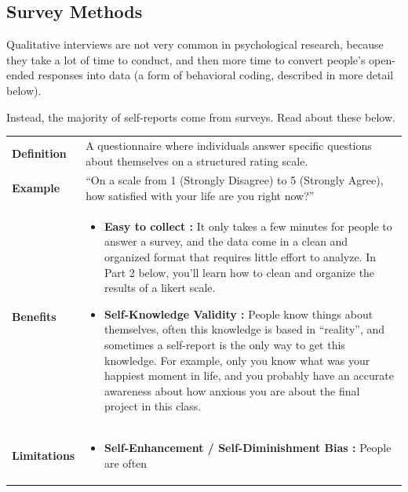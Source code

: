 \documentclass[
  letterpaper,
  DIV=11,
  numbers=noendperiod,
  oneside]{scrreprt}
\begin{document}
\subsection{Survey Methods}\label{survey-methods}

Qualitative interviews are not very common in psychological research,
because they take a lot of time to conduct, and then more time to
convert people's open-ended responses into data (a form of behavioral
coding, described in more detail below).

Instead, the majority of self-reports come from surveys. Read about
these below.

\begin{longtable}[]{@{}
  >{\raggedright\arraybackslash}p{}
  >{\raggedright\arraybackslash}p{}@{}}
\toprule\noalign{}
\endhead
\bottomrule\noalign{}
\endlastfoot
\textbf{Definition} & A questionnaire where individuals answer specific
questions about themselves on a structured rating scale. \\
\textbf{Example} & ``On a scale from 1 (Strongly Disagree) to 5
(Strongly Agree), how satisfied with your life are you right now?'' \\
\textbf{Benefits} & \begin{minipage}[t]{\linewidth}\raggedright
\begin{itemize}
\item
  \textbf{Easy to collect :} It only takes a few minutes for people to
  answer a survey, and the data come in a clean and organized format
  that requires little effort to analyze. In Part 2 below, you'll learn
  how to clean and organize the results of a likert scale.
\item
  \textbf{Self-Knowledge Validity :} People know things about
  themselves, often this knowledge is based in ``reality'', and
  sometimes a self-report is the only way to get this knowledge. For
  example, only you know what was your happiest moment in life, and you
  probably have an accurate awareness about how anxious you are about
  the final project in this class.
\end{itemize}
\end{minipage} \\
\textbf{Limitations} & \begin{minipage}[t]{\linewidth}\raggedright
\begin{itemize}
\item
  \textbf{Self-Enhancement / Self-Diminishment Bias :} People are often

\end{itemize}
\end{minipage}
\end{longtable}
\end{document}
